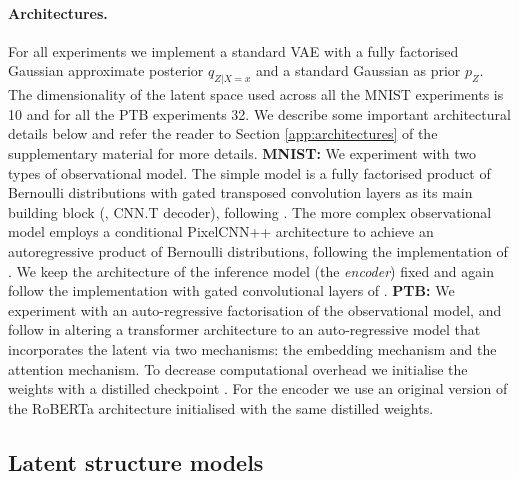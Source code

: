 \paragraph{Architectures.} For all experiments we implement a standard VAE with a fully factorised Gaussian approximate posterior $q_{Z|X=x}$ and a standard Gaussian as prior $p_Z$. The dimensionality of the latent space used across all the MNIST experiments is 10 and for all the PTB experiments 32. We describe some important architectural details below and refer the reader to Section \ref{app:architectures} of the supplementary material for more details. {\bf MNIST:} We experiment with two types of observational model. The simple model is a fully factorised product of Bernoulli distributions with gated transposed convolution layers as its main building block (\ie, CNN.T decoder), following \citet{van2018sylvester}. %
The more complex observational model employs a conditional PixelCNN++ architecture \citep{salimans2017pixelcnn++} to achieve an autoregressive product of Bernoulli distributions, following the implementation of \cite{alemi2018fixing}. %
We keep the architecture of the inference model (the \textit{encoder}) fixed and again follow the implementation with gated convolutional layers of \citet{van2018sylvester}. {\bf PTB:} We experiment with an auto-regressive factorisation of the observational model, and follow \cite{li2020optimus} in altering a transformer architecture \citep[RoBERTa;][]{liu2019roberta} to an auto-regressive model that incorporates the latent via two mechanisms: the embedding mechanism and the attention mechanism. To decrease computational overhead we initialise the weights with a distilled checkpoint \citep{Sanh2019DistilBERTAD}. For the encoder we use an original version of the RoBERTa architecture initialised with the same distilled weights.



\subsection{Latent structure models}\label{subsec:bda_models}

